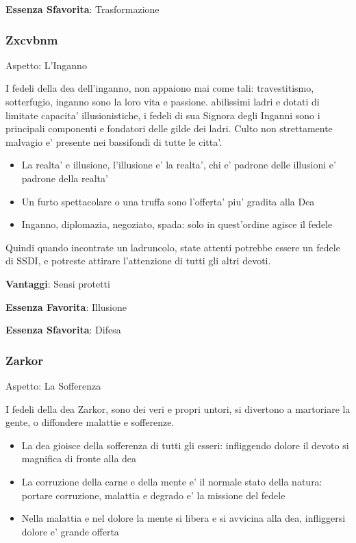 \documentclass[a4paper,11pt,twoside,openany]{book}
\begin{document}
\textbf{Essenza Sfavorita}: Trasformazione
\bigskip

\subsubsection{Zxcvbnm}

Aspetto: L'Inganno
\bigskip


I fedeli della dea dell'inganno, non appaiono mai come tali: travestitismo, sotterfugio, inganno sono la loro vita e passione. abilissimi ladri e dotati di limitate capacita' illusionistiche, i fedeli di sua Signora degli Inganni sono i principali componenti e fondatori delle gilde dei ladri. Culto non strettamente malvagio e' presente nei bassifondi di tutte le citta'.

\begin{itemize}
	\item La realta' e illusione, l'illusione e' la realta', chi e' padrone delle illusioni e' padrone della realta'
	\item Un furto spettacolare o una truffa sono l'offerta' piu' gradita alla Dea
	\item Inganno, diplomazia, negoziato, spada: solo in quest'ordine agisce il fedele
\end{itemize}

Quindi quando incontrate un ladruncolo, state attenti potrebbe essere un fedele di SSDI, e potreste attirare l'attenzione di tutti gli altri devoti.

\textbf{Vantaggi}: Sensi protetti

\textbf{Essenza Favorita}: Illusione

\textbf{Essenza Sfavorita}: Difesa
\bigskip


\subsubsection{Zarkor}

Aspetto: La Sofferenza
\bigskip


I fedeli della dea Zarkor, sono dei veri e propri untori, si divertono a martoriare la gente, o diffondere malattie e sofferenze.

\begin{itemize}
	\item La dea gioisce della sofferenza di tutti gli esseri: infliggendo dolore il devoto si magnifica di fronte alla dea
	\item La corruzione della carne e della mente e' il normale stato della natura: portare corruzione, malattia e degrado e' la missione del fedele
	\item Nella malattia e nel dolore la mente si libera e si avvicina alla dea, infliggersi dolore e' grande offerta
\end{itemize}
\end{document}
